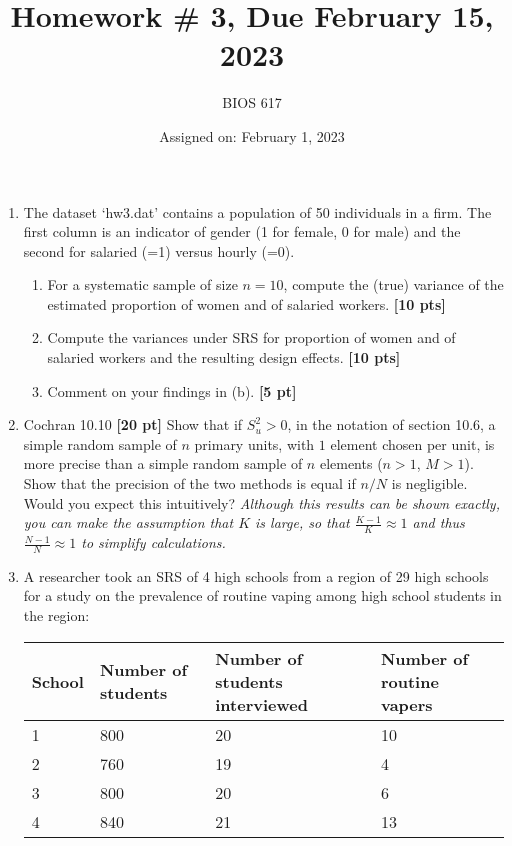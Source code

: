\documentclass[12pt]{article}
\begin{document}
\title{Homework \# 3, Due February 15, 2023}
\author{BIOS 617}
\date{Assigned on: February 1, 2023}

\maketitle

\begin{enumerate}
\setlength{\itemsep}{15pt}%
\setlength{\parskip}{15pt}%

\item  The dataset `hw3.dat' contains a population of 50 individuals in a firm. The first column is an indicator of gender (1 for female, 0 for male) and the second for salaried (=1) versus hourly (=0).
	\begin{enumerate}
	\item For a systematic sample of size $n=10$, compute the (true) variance of the estimated proportion of women and of salaried workers. {\bf [10 pts]}
	\item Compute the variances under SRS for proportion of women and of salaried workers and the resulting design effects. {\bf [10 pts]}
	\item Comment on your findings in (b). {\bf [5 pt]}
	\end{enumerate}

\item Cochran 10.10 {\bf [20 pt]} Show that if $S_u^2 >0$, in the notation of section 10.6, a simple random sample of $n$ primary units, with $1$ element chosen per unit, is more precise than a simple random sample of $n$ elements ($n>1$, $M>1$). Show that the precision of the two methods is equal if $n/N$ is negligible. Would you expect this intuitively? \emph{Although this results can be shown exactly, you can make the assumption that $K$ is large, so that $\frac{K-1}{K} \approx 1$ and thus $\frac{N-1}{N} \approx 1$ to simplify calculations.}

\item A researcher took an SRS of 4 high schools from a region of 29 high schools for a study on the prevalence of routine vaping among high school students in the region:

\begin{table}[!th]
\centering
\begin{tabular}{p{1in} | p{1in} p{1in} p{1in}}
School & Number of students & Number of students interviewed & Number of routine vapers \\ \hline
1 & 800 & 20 & 10 \\
2 & 760 & 19 & 4 \\
3 & 800 & 20 & 6 \\
4 & 840 & 21 & 13 \\ \hline
\end{tabular}
\end{table}


\end{enumerate}
\end{document}
